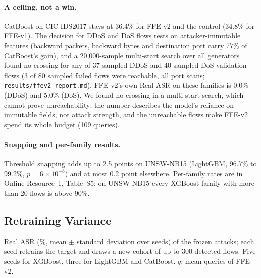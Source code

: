 \paragraph{A ceiling, not a win.} CatBoost on CIC-IDS2017 stays at 36.4\% for FFE-v2 and the control (34.8\% for FFE-v1). The decision for DDoS and DoS flows rests on attacker-immutable features (backward packets, backward bytes and destination port carry 77\% of CatBoost's gain), and a 20,000-sample multi-start search over all generators found no crossing for any of 37 sampled DDoS and 40 sampled DoS validation flows (3 of 80 sampled failed flows were reachable, all port scans; \texttt{results/ffev2\_report.md}). FFE-v2's own Real ASR on these families is 0.0\% (DDoS) and 5.0\% (DoS). We found no crossing in a multi-start search, which cannot prove unreachability; the number describes the model's reliance on immutable fields, not attack strength, and the unreachable flows make FFE-v2 spend its whole budget (109 queries).

\paragraph{Snapping and per-family results.} Threshold snapping adds up to 2.5 points on UNSW-NB15 (LightGBM, 96.7\% to 99.2\%, $p=6\times10^{-8}$) and at most 0.2 point elsewhere. Per-family rates are in Online Resource~1, Table~S5; on UNSW-NB15 every XGBoost family with more than 20 flows is above 90\%.

\subsection{Retraining Variance}
\label{sec:seeds}

\begin{table}[!htbp]
\caption{Real ASR (\%, mean $\pm$ standard deviation over seeds) of the frozen attacks; each seed retrains the target and draws a new cohort of up to 300 detected flows. Five seeds for XGBoost, three for LightGBM and CatBoost. $q$: mean queries of FFE-v2.}\label{tab:seeds}
\centering
\resizebox{\textwidth}{!}{\begin{varwidth}{\maxdimen}\noindent%
%
\end{varwidth}}
\end{table}

